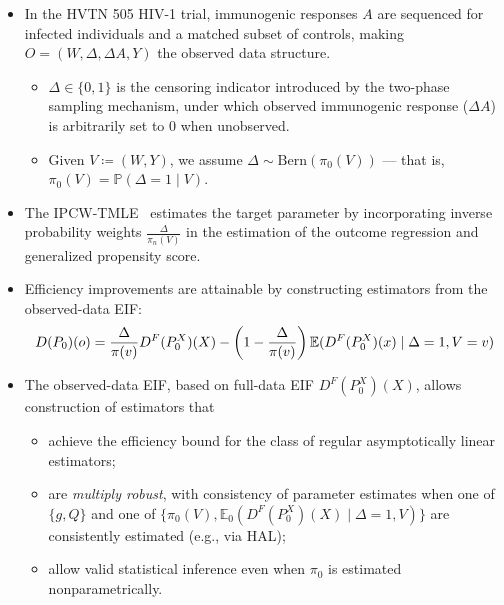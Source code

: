 \documentclass[landscape,a0paper,fontscale=0.285]{baposter} %
\begin{document}
\begin{poster}
{\vspace{-0.35em}
\begin{itemize}
\itemsep-2pt
\item In the HVTN 505 HIV-1 trial, immunogenic responses $A$ are sequenced for
  infected individuals and a matched subset of controls, making
  \textbf{$O = (W, \Delta, \Delta A, Y)$} the observed data structure.
  \vspace{-0.25em}
  \begin{itemize}
    \itemsep0pt
    \item $\Delta \in \{0, 1\}$ is the censoring indicator introduced by the
      two-phase sampling mechanism, under which observed immunogenic response
      ($\Delta A$) is arbitrarily set to $0$ when unobserved.
    \item Given $V \coloneqq (W, Y)$, we assume $\Delta \sim
      \text{Bern}(\pi_0(V))$ --- that is, $\pi_0(V) =
      \mathbb{P}(\Delta = 1 \mid V)$.
  \end{itemize}
\item The IPCW-TMLE~\cite{rose2011targeted2sd} estimates the target parameter by
  incorporating inverse probability weights $\frac{\Delta}{\pi_n(V)}$ in the
  estimation of the outcome regression and generalized propensity score.
\item Efficiency improvements are attainable by constructing estimators from the
  observed-data EIF:
  \begin{equation*}
    D(P_0)(o) = \frac{\Delta}{\pi(v)} D^F(P_0^X)(X) - \left(1 -
      \frac{\Delta}{\pi(v)}\right)\mathbb{E}(D^F(P_0^X)(x) \mid \Delta = 1,
      V = v)
  \vspace{-0.5em}
  \end{equation*}%
\item The observed-data EIF, based on full-data EIF $D^F(P_0^X)(X)$, allows
  construction of estimators that
  \vspace{-0.5em}
  \begin{itemize}
    \itemsep0pt
    \item achieve the efficiency bound for the class of regular asymptotically
      linear estimators;
    \item are \textit{multiply robust}, with consistency of parameter estimates
      when one of $\{g, Q\}$ and one of $\{\pi_0(V), \mathbb{E}_0(D^F(P_0^X)(X)
      \mid \Delta = 1, V)\}$ are consistently estimated (e.g., via HAL);
    \item allow valid statistical inference even when $\pi_0$ is estimated
      nonparametrically.
  \end{itemize}
\end{itemize}
}


\end{poster}
\end{document}
